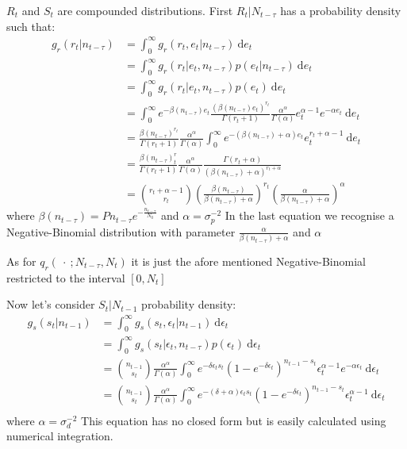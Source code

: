 \documentclass{article}
\begin{document}
	$R_t$ and $S_t$ are compounded distributions.
	First $R_t | N_{t-\tau}$ has a probability density such that:
	\begin{equation*}
	\begin{split}
			g_r(r_t | n_{t-\tau}) & = \int_{0}^{\infty}g_r(r_t, e_t | n_{t-\tau})\ \mathrm{d}e_t \\
			& = \int_{0}^{\infty}g_r(r_t | e_t, n_{t-\tau})p(e_t | n_{t-\tau})\ \mathrm{d}e_t \\
			& = \int_{0}^{\infty}g_r(r_t | e_t, n_{t-\tau})p(e_t)\ \mathrm{d}e_t \\
			& = \int_{0}^{\infty}e^{-\beta(n_{t-\tau})e_t}\frac{(\beta(n_{t-\tau})e_t)^{r_t}}{\Gamma(r_t+1)}\frac{\alpha^\alpha}{\Gamma(\alpha)}e_t^{\alpha-1}e^{-\alpha e_t}\ \mathrm{d}e_t \\
			& = \frac{\beta(n_{t-\tau})^{r_t}}{\Gamma(r_t+1)}\frac{\alpha^\alpha}{\Gamma(\alpha)}\int_{0}^{\infty}e^{-(\beta(n_{t-\tau})+\alpha)e_t}e_t^{r_t+\alpha-1}\ \mathrm{d}e_t \\
			& = \frac{\beta(n_{t-\tau})^r_t}{\Gamma(r_t+1)}\frac{\alpha^\alpha}{\Gamma(\alpha)}\frac{\Gamma(r_t+\alpha)}{(\beta(n_{t-\tau})+\alpha)^{r_t+\alpha}} \\
			& = \binom{r_t + \alpha - 1}{r_t}(\frac{\beta(n_{t-\tau})}{\beta(n_{t-\tau}) + \alpha})^{r_t}(\frac{\alpha}{\beta(n_{t-\tau}) + \alpha})^\alpha
	\end{split}
	\end{equation*}
	where $\beta(n_{t-\tau}) = Pn_{t-\tau}e^{-\frac{n_{t-\tau}}{N_0}}$ and $\alpha = \sigma_p^{-2}$
	In the last equation we recognise a Negative-Binomial distribution with parameter $\frac{\alpha}{\beta(n_{t-\tau}) + \alpha}$ and $\alpha$
	
	As for $q_r(\ \cdot \ ; N_{t-\tau}, N_t)$ it is just the afore mentioned Negative-Binomial restricted to the interval $[0, N_t]$
	
	Now let's consider $S_t | N_{t-1}$ probability density:
	\begin{equation*}
	\begin{split}
	g_s(s_t | n_{t-1}) & = \int_{0}^{\infty}g_s(s_t, \epsilon_t | n_{t-1})\ \mathrm{d}\epsilon_t \\
	& = \int_{0}^{\infty}g_s(s_t | \epsilon_t, n_{t-\tau})p(\epsilon_t)\ \mathrm{d}\epsilon_t \\
	& = \binom{n_{t-1}}{s_t}\frac{\alpha^\alpha}{\Gamma(\alpha)} \int_{0}^{\infty}e^{-\delta\epsilon_t s_t}(1-e^{-\delta\epsilon_t})^{n_{t-1}-s_t}\epsilon_t^{\alpha-1}e^{-\alpha\epsilon_t}\ \mathrm{d}\epsilon_t \\
	& = \binom{n_{t-1}}{s_t}\frac{\alpha^\alpha}{\Gamma(\alpha)}\int_{0}^{\infty}e^{-(\delta+\alpha)\epsilon_t s_t}(1-e^{-\delta\epsilon_t})^{n_{t-1}-s_t}\epsilon_t^{\alpha-1}\ \mathrm{d}\epsilon_t \\
	\end{split}
	\end{equation*}
	where $\alpha = \sigma_d^{-2}$
	This equation has no closed form but is easily calculated using numerical integration.
	
\end{document}
